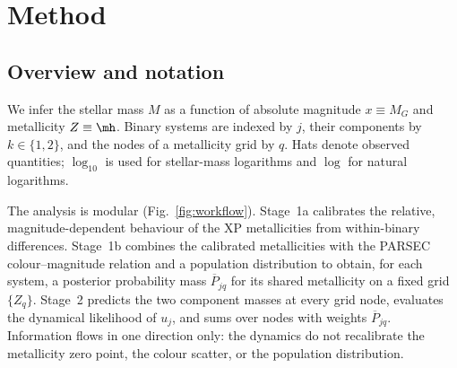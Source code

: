 \section{Method}
\label{sec:methods}

\subsection{Overview and notation}
\label{sec:overview}

We infer the stellar mass $M$ as a function of absolute magnitude
$x\equiv M_G$ and metallicity $Z\equiv\mh$.  Binary systems are indexed by
$j$, their components by $k\in\{1,2\}$, and the nodes of a metallicity grid
by $q$.  Hats denote observed quantities; $\log_{10}$ is used for stellar-mass
logarithms and $\log$ for natural logarithms.

The analysis is modular \citep{LiuBayarriBerger2009Modularization,
Plummer2015Cuts} (Fig.~\ref{fig:workflow}).  Stage~1a calibrates the relative,
magnitude-dependent behaviour of the XP metallicities from within-binary
differences.  Stage~1b combines the calibrated metallicities with the PARSEC
colour--magnitude relation and a population distribution to obtain, for each
system, a posterior probability mass $\overline P_{jq}$ for its shared
metallicity on a fixed grid $\{Z_q\}$.  Stage~2 predicts the two component
masses at every grid node, evaluates the dynamical likelihood of $u_j$, and
sums over nodes with weights $\overline P_{jq}$.  Information flows in one
direction only: the dynamics do not recalibrate the metallicity zero point,
the colour scatter, or the population distribution.

